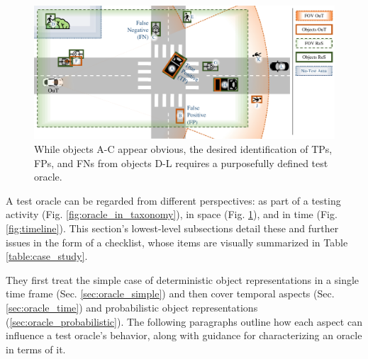 \documentclass[conference]{IEEEtran}
\begin{document}
\begin{figure}[t]
	\centering
	\vspace*{2mm}
	\includegraphics[width=\textwidth]{img/top_down_fitting_slide.pdf}
	
	\caption{ While objects A-C appear obvious, the desired identification of TPs, FPs, and FNs from objects D-L requires a purposefully defined test oracle. 
	}
	\label{fig:top_down_all}
\end{figure}


A test oracle can be regarded from different perspectives: as part of a testing activity (Fig. \ref{fig:oracle_in_taxonomy}), in space (Fig. \ref{fig:top_down_all}), and in time (Fig. \ref{fig:timeline}).
This section's lowest-level subsections detail these and further issues in the form of a checklist, whose items are visually summarized in Table \ref{table:case_study}. 

They first treat the simple case of deterministic object representations in a single time frame (Sec. \ref{sec:oracle_simple}) and then cover temporal aspects (Sec. \ref{sec:oracle_time}) and probabilistic object representations (\ref{sec:oracle_probabilistic}).
The following paragraphs outline how each aspect can influence a test oracle's behavior, along with guidance for characterizing an oracle in terms of it. 
\end{document}
